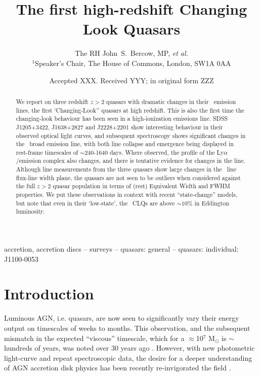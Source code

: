 \documentclass[a4paper,fleqn,usenatbib]{mnras}
\title[High-redshift CLQs]{The first high-redshift Changing Look Quasars}
\author[Bercow]
{The RH John~S.~Bercow, MP, {\it et al.} 
\\
$^{1}$Speaker's Chair, The House of Commons, London, SW1A 0AA \\
}
\date{Accepted XXX. Received YYY; in original form ZZZ}
\begin{document}
\label{firstpage}
\pagerange{\pageref{firstpage}--\pageref{lastpage}}
\maketitle

\begin{abstract}
We report on three redshift $z>2$ quasars with dramatic changes in
their \civ\ emission lines, the first `Changing-Look'' quasars at high
redshift.  This is also the first time the changing-look behaviour has
been seen in a high-ionization emissions line.
SDSS J1205+3422, J1638+2827 and J2228+2201 show interesting behaviour
in their observed optical light curves, and subsequent spectroscopy
shows significant changes in the \civ\ broad emission line, with both
line collapse and emergence being displayed in rest-frame timescales
of $\sim$240-1640 days.
Where observed, the profile of the Ly$\alpha$/\nv emission complex
also changes, and there is tentative evidence for changes in the \mgii
line.
Although line measurements from the three quasars show large changes
in the \civ\ line flux-line width plane, the quasars are not seen to
be outliers when considered against the full $z>2$ quasar population
in terms of (rest) Equivalent Width and FWHM properties.
We put these observations in context with recent ``state-change''
models, but note that even in their `low-state', the \civ\ CLQs are
above $\sim10\%$ in Eddington luminosity.
\end{abstract}



\begin{keywords}
accretion, accretion discs -- surveys -- quasars: general -- quasars: individual: J1100-0053 
\end{keywords}



\section{Introduction}
Luminous AGN, i.e. quasars, are now seen to significantly vary their
energy output on timescales of weeks to months.  This observation, and
the subsequent mismatch in the expected ``viscous'' timescale, which
for a $\approx$10$^{7}$ M$_{\odot}$ is $\sim$hundreds of years, was
noted over 30 years ago \citep[e.g.][]{Alloin1985}. However, with new
photometric light-curve and repeat spectroscopic data, the desire for
a deeper understanding of AGN accretion disk physics has been recently
re-invigorated the field \citep[e.g.][]{Lawrence2018, Antonucci2018}.
\end{document}
